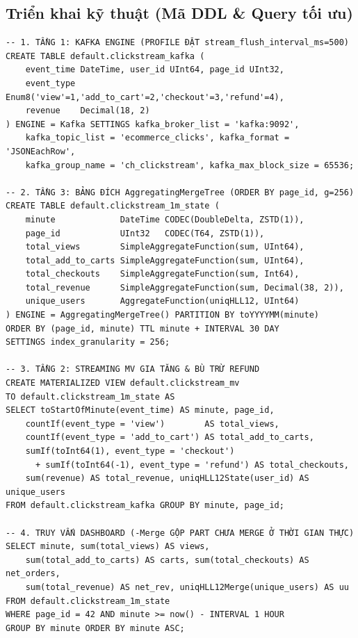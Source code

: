 \documentclass[13pt,a4paper]{report}
\begin{document}
\subsection{Triển khai kỹ thuật (Mã DDL \& Query tối ưu)}
\begin{tcolorbox}[sqlblock]
\setlength{\topsep}{0pt}\setlength{\partopsep}{0pt}\footnotesize{}
\begin{verbatim}
-- 1. TẦNG 1: KAFKA ENGINE (PROFILE ĐẶT stream_flush_interval_ms=500)
CREATE TABLE default.clickstream_kafka (
    event_time DateTime, user_id UInt64, page_id UInt32,
    event_type Enum8('view'=1,'add_to_cart'=2,'checkout'=3,'refund'=4),
    revenue    Decimal(18, 2)
) ENGINE = Kafka SETTINGS kafka_broker_list = 'kafka:9092',
    kafka_topic_list = 'ecommerce_clicks', kafka_format = 'JSONEachRow',
    kafka_group_name = 'ch_clickstream', kafka_max_block_size = 65536;

-- 2. TẦNG 3: BẢNG ĐÍCH AggregatingMergeTree (ORDER BY page_id, g=256)
CREATE TABLE default.clickstream_1m_state (
    minute             DateTime CODEC(DoubleDelta, ZSTD(1)),
    page_id            UInt32   CODEC(T64, ZSTD(1)),
    total_views        SimpleAggregateFunction(sum, UInt64),
    total_add_to_carts SimpleAggregateFunction(sum, UInt64),
    total_checkouts    SimpleAggregateFunction(sum, Int64),
    total_revenue      SimpleAggregateFunction(sum, Decimal(38, 2)),
    unique_users       AggregateFunction(uniqHLL12, UInt64)
) ENGINE = AggregatingMergeTree() PARTITION BY toYYYYMM(minute)
ORDER BY (page_id, minute) TTL minute + INTERVAL 30 DAY
SETTINGS index_granularity = 256;

-- 3. TẦNG 2: STREAMING MV GIA TĂNG & BÙ TRỪ REFUND
CREATE MATERIALIZED VIEW default.clickstream_mv
TO default.clickstream_1m_state AS
SELECT toStartOfMinute(event_time) AS minute, page_id,
    countIf(event_type = 'view')        AS total_views,
    countIf(event_type = 'add_to_cart') AS total_add_to_carts,
    sumIf(toInt64(1), event_type = 'checkout')
      + sumIf(toInt64(-1), event_type = 'refund') AS total_checkouts,
    sum(revenue) AS total_revenue, uniqHLL12State(user_id) AS unique_users
FROM default.clickstream_kafka GROUP BY minute, page_id;

-- 4. TRUY VẤN DASHBOARD (-Merge GỘP PART CHƯA MERGE Ở THỜI GIAN THỰC)
SELECT minute, sum(total_views) AS views,
    sum(total_add_to_carts) AS carts, sum(total_checkouts) AS net_orders,
    sum(total_revenue) AS net_rev, uniqHLL12Merge(unique_users) AS uu
FROM default.clickstream_1m_state
WHERE page_id = 42 AND minute >= now() - INTERVAL 1 HOUR
GROUP BY minute ORDER BY minute ASC;
\end{verbatim}
\end{tcolorbox}
\end{document}
